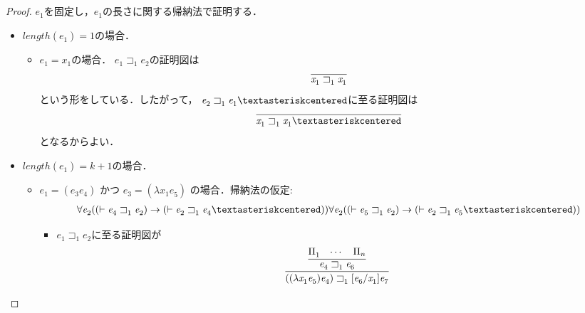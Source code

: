 \documentclass{ltjsbook}%
\begin{document}
\begin{proof}%
  $\mathit{e}_1^{}$を固定し，$\mathit{e}_1^{}$の長さに関する帰納法で証明する．%
  \begin{itemize}%
  \item $length(\mathit{e}_1^{})=1$の場合．%
    \begin{itemize}%
    \item $\mathit{e}_1^{}=\mathit{x}_1^{}$の場合．%
      $\mathit{e}_1^{}\sqsupset_1^{}\mathit{e}_2^{}$の証明図は%
      \begin{equation}%
        \infer{%
          \mathit{x}_1^{}\sqsupset_1^{}\mathit{x}_1^{}%
        }{%
        }%
      \end{equation}%
      という形をしている．したがって，%
      $\mathit{e}_2^{}\sqsupset_1^{}\mathit{e}_1^{}\textasteriskcentered$に至る証明図は%
      \begin{equation}%
        \infer{%
          \mathit{x}_1^{}\sqsupset_1^{}\mathit{x}_1^{}\textasteriskcentered%
        }{%
        }%
      \end{equation}%
      となるからよい．%
    \end{itemize}%
  \item $length(\mathit{e}_1^{})=k + 1$の場合．%
    \begin{itemize}%
    \item $\mathit{e}_1^{}=(\mathit{e}_3^{}\mathit{e}_4^{})$ かつ%
      $\mathit{e}_3^{}=(\lambda \mathit{x}_1^{}\mathit{e}_5^{})$ の場合．帰納法の仮定:%
      \begin{align}%
        \forall\mathit{e}_2^{}((\vdash\mathit{e}_4^{}\sqsupset_1^{}\mathit{e}_2^{})\rightarrow%
        (\vdash\mathit{e}_2^{}\sqsupset_1^{}\mathit{e}_4^{}\textasteriskcentered))%
        \forall\mathit{e}_2^{}((\vdash\mathit{e}_5^{}\sqsupset_1^{}\mathit{e}_2^{})\rightarrow%
        (\vdash\mathit{e}_2^{}\sqsupset_1^{}\mathit{e}_5^{}\textasteriskcentered))\\%
      \end{align}%
      \begin{itemize}%
      \item $\mathit{e}_1^{}\sqsupset_1^{}\mathit{e}_2^{}$に至る証明図が%
        \begin{equation}%
          \infer{%
            ((\lambda\mathit{x}_1^{}\mathit{e}_5^{})\mathit{e}_4^{})\sqsupset_1^{}%
            [\mathit{e}_6^{}/\mathit{x}_1^{}]\mathit{e}_7^{}%
          }{%
            \infer{%
              \mathit{e}_4^{}\sqsupset_1^{}\mathit{e}_6^{}%
            }{%
              \Pi_1^{}&\cdots&\Pi_n%
            }%
}
\end{equation}
\end{itemize}
\end{itemize}
\end{itemize}
\end{proof}
\end{document}

